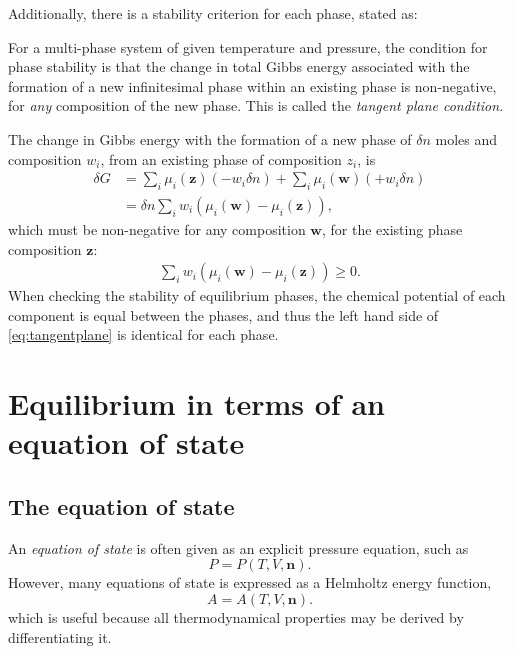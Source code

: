 \documentclass[english]{../thermomemo/thermomemo}
\newcommand*{\vektor}[1]{\boldsymbol{#1}}%
\begin{document}
Additionally, there is a stability criterion for each phase, stated as:
\begin{framed}
  \noindent
  For a multi-phase system of given temperature and pressure, the condition for phase stability is that the change in total Gibbs energy associated with 
  the formation of a new infinitesimal phase within an existing phase is non-negative, for \textit{any} composition of the new phase. 
  This is called the \textit{tangent plane condition}.
\end{framed}
The change in Gibbs energy with the formation of a new phase of $\delta n$ moles and composition $w_i$, from an existing phase of composition $z_i$, is
\begin{align}
  \delta G 
  &= \sum_i \mu_i(\vektor{z})\left( - w_i \delta n \right) + \sum_i \mu_i(\vektor{w})\left( + w_i \delta n \right) \nonumber\\
  &= \delta n \sum_i w_i \left( \mu_i(\vektor{w}) - \mu_i(\vektor{z}) \right), 
  \label{}
\end{align}
which must be non-negative for any composition $\vektor{w}$, for the existing phase composition $\vektor{z}$:
\begin{align}
  \sum_i w_i \left( \mu_i(\vektor{w}) - \mu_i(\vektor{z}) \right) \geq 0.
  \label{eq:tangentplane}
\end{align}
When checking the stability of equilibrium phases, the chemical potential of each component is equal between the phases, and thus the left hand side of 
\eqref{eq:tangentplane} is identical for each phase.



\section{Equilibrium in terms of an equation of state}
\subsection{The equation of state}
An \textit{equation of state} is often given as an explicit pressure equation, such as 
\begin{equation}
  P = P (T,V,\vektor{n}).
  \label{}
\end{equation}
However, many equations of state is expressed as a Helmholtz energy
function, 
\begin{equation}
  A = A(T,V,\vektor{n}).
  \label{}
\end{equation}
which is useful because all thermodynamical properties
may be derived by differentiating it.
\end{document}
